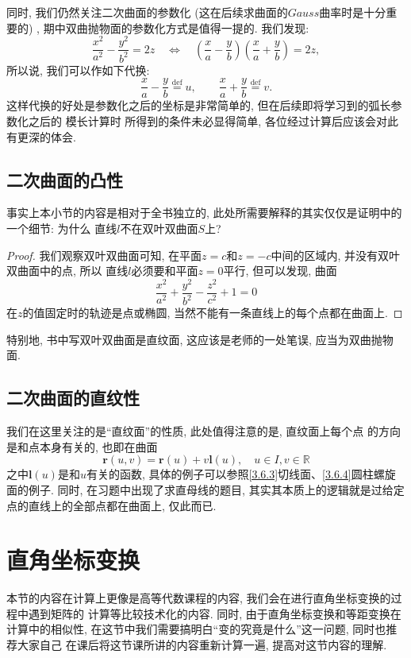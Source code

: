 \documentclass[./main.tex]{subfiles}
\begin{document}
同时, 我们仍然关注二次曲面的参数化 (这在后续求曲面的$Gauss$曲率时是十分重要的) , 期中双曲抛物面的参数化方式是值得一提的. 我们发现:
\[
\frac{x^2}{a^2}-\frac{y^2}{b^2}=2z\quad
\Longleftrightarrow\quad
\left(\frac{x}{a}-\frac{y}{b}\right)
\left(\frac{x}{a}+\frac{y}{b}\right)=2z,
\]
所以说, 我们可以作如下代换: 
\[
    \frac{x}{a}-\frac{y}{b}\overset{\text{def}}{=}u,
\qquad
\frac{x}{a}+\frac{y}{b}\overset{\text{def}}{=} v.
\]
这样代换的好处是参数化之后的坐标是非常简单的, 但在后续即将学习到的弧长参数化之后的
模长计算时
所得到的条件未必显得简单, 各位经过计算后应该会对此有更深的体会.
\subsection{二次曲面的凸性}
事实上本小节的内容是相对于全书独立的, 此处所需要解释的其实仅仅是证明中的一个细节: 为什么
直线$l$不在双叶双曲面$S$上?
\begin{proof}
我们观察双叶双曲面可知, 在平面$z=c$和$z=-c$中间的区域内, 并没有双叶双曲面中的点, 所以
直线$l$必须要和平面$z=0$平行, 但可以发现, 曲面
\[
\frac{x^2}{a^2}+\frac{y^2}{b^2}-\frac{z^2}{c^2}+1=0
\]
在$z$的值固定时的轨迹是点或椭圆, 当然不能有一条直线上的每个点都在曲面上. 
\end{proof}
特别地, 书中写双叶双曲面是直纹面, 这应该是老师的一处笔误, 应当为双曲抛物面. 
\subsection{二次曲面的直纹性}

我们在这里关注的是``直纹面''的性质, 此处值得注意的是, 直纹面上每个点
的方向是和点本身有关的, 也即在曲面
\[
\mathbf{r}(u,v)=\mathbf{r}(u)+v\mathbf{l}(u),
\quad
u\in I,v\in \mathbb{R}
\]
之中$\mathbf{l}(u)$是和$u$有关的函数, 具体的例子可以参照\ref{3.6.3}切线面、\ref{3.6.4}圆柱螺旋面的例子. 
同时, 在习题中出现了求直母线的题目, 其实其本质上的逻辑就是过给定点的直线上的全部点都在曲面上, 仅此而已. 

\section{直角坐标变换}\label{3.3}

本节的内容在计算上更像是高等代数课程的内容, 我们会在进行直角坐标变换的过程中遇到矩阵的
计算等比较技术化的内容. 同时, 由于直角坐标变换和等距变换在计算中的相似性, 在这节中我们需要搞明白``变的究竟是什么''这一问题, 同时也推荐大家自己
在课后将这节课所讲的内容重新计算一遍, 提高对这节内容的理解.
\end{document}
